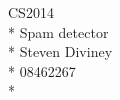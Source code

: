 \documentclass[a4paper,12pt]{article}
\begin{document}
\begin{center}
{\large CS2014} \\*
Spam detector \\*
Steven Diviney \\*
08462267\\*
\end{center}
\end{document}
